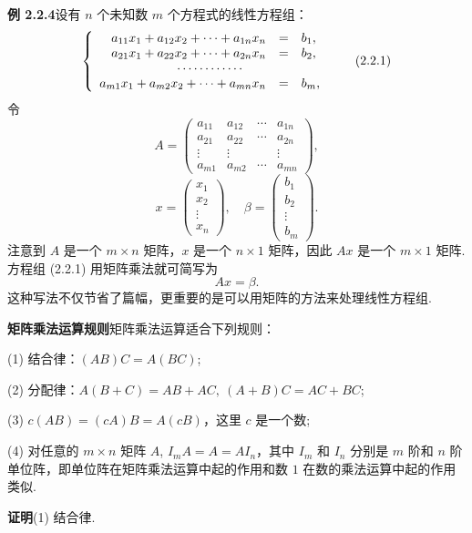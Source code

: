 \documentclass[UTF8, 12pt, fontset=fandol, oneside]{ctexart}
\begin{document}
\noindent\textbf{例 2.2.4}\quad 设有 $n$ 个未知数 $m$ 个方程式的线性方程组：
\begin{equation}
\left\{\begin{array}{rcl}
a_{11}x_1+a_{12}x_2+\cdots+a_{1n}x_n&=&b_1,\\
a_{21}x_1+a_{22}x_2+\cdots+a_{2n}x_n&=&b_2,\\
\multicolumn{3}{c}{\cdots\cdots\cdots\cdots}\\
a_{m1}x_1+a_{m2}x_2+\cdots+a_{mn}x_n&=&b_m,
\end{array}\right.
\tag{2.2.1}
\end{equation}
令
\[
A=\left(\begin{array}{cccc}
a_{11} & a_{12} & \cdots & a_{1n}\\
a_{21} & a_{22} & \cdots & a_{2n}\\
\vdots & \vdots & & \vdots\\
a_{m1} & a_{m2} & \cdots & a_{mn}
\end{array}\right),
\]
\[
x=\left(\begin{array}{c}
x_1\\
x_2\\
\vdots\\
x_n
\end{array}\right),\quad
\beta=\left(\begin{array}{c}
b_1\\
b_2\\
\vdots\\
b_m
\end{array}\right).
\]
注意到 $A$ 是一个 $m\times n$ 矩阵，$x$ 是一个 $n\times 1$ 矩阵，因此 $Ax$ 是一个 $m\times 1$ 矩阵. 方程组 (2.2.1) 用矩阵乘法就可简写为
\begin{equation}
Ax=\beta.
\tag{2.2.2}
\end{equation}
这种写法不仅节省了篇幅，更重要的是可以用矩阵的方法来处理线性方程组.

\noindent\textbf{矩阵乘法运算规则}\quad 矩阵乘法运算适合下列规则：

(1) 结合律：$(AB)C=A(BC)$;

(2) 分配律：$A(B+C)=AB+AC,\ (A+B)C=AC+BC$;

(3) $c(AB)=(cA)B=A(cB)$，这里 $c$ 是一个数;

(4) 对任意的 $m\times n$ 矩阵 $A$, $I_mA=A=AI_n$，其中 $I_m$ 和 $I_n$ 分别是 $m$ 阶和 $n$ 阶单位阵，即单位阵在矩阵乘法运算中起的作用和数 $1$ 在数的乘法运算中起的作用类似.

\noindent\textbf{证明}\quad (1) 结合律.
\end{document}
